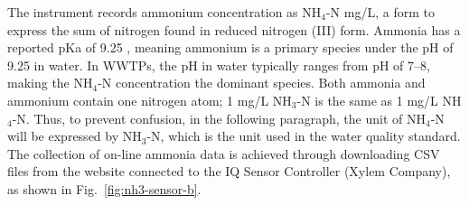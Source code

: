 The instrument records ammonium concentration as NH$_{4}$-N mg/L, a form to express the sum of nitrogen found in reduced nitrogen (III) form. Ammonia has a reported pKa of 9.25 \citep{nationalcenterforbiotechnologyinformationPubChemCompoundSummary2022}, meaning ammonium is a primary species under the pH of 9.25 in water. In WWTPs, the pH in water typically ranges from pH of 7--8, making the NH$_{4}$-N concentration the dominant species. Both ammonia and ammonium contain one nitrogen atom; 1 mg/L NH$_{3}$-N is the same as 1 mg/L NH$_{4}$-N. Thus, to prevent confusion, in the following paragraph, the unit of NH$_{4}$-N will be expressed by NH$_{3}$-N, which is the unit used in the water quality standard. The collection of on-line ammonia data is achieved through downloading CSV files from the website connected to the IQ Sensor Controller (Xylem Company), as shown in Fig.~\ref{fig:nh3-sensor-b}. 


